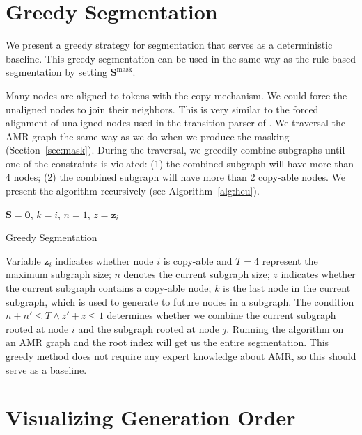 \documentclass[11pt]{article}
\begin{document}
\section{Greedy Segmentation} \label{append:greedy}
We present a greedy strategy for segmentation that serves as a deterministic baseline. This greedy segmentation can be used in the same way as the rule-based segmentation by setting $\mathbf{S}^\mathrm{mask}$. 

Many nodes are aligned to tokens with the copy mechanism. We could force the unaligned nodes to join their neighbors. This is very similar to the forced alignment of unaligned nodes used in the transition parser of . 
We traversal the AMR graph the same way as we do when we produce the masking (Section~\ref{sec:mask}).  During the traversal, we greedily combine subgraphs until one of the constraints is violated: (1) the combined subgraph will have more than 4 nodes; (2) the combined subgraph will have more than 2 copy-able nodes. We present the algorithm recursively (see Algorithm~\ref{alg:heu}).
\begin{algorithm}[ht!] 
\SetAlgoLined
{}
\vspace{1ex}
  $\mathbf{S} = \mathbf{0} $, $k=i$, $n=1$, $z=\mathbf{z}_i$\;
 \caption{Greedy Segmentation \label{alg:heu}}
\end{algorithm}
Variable $\mathbf{z}_i $ indicates whether node $i$ is copy-able and $T=4$ represent the maximum subgraph size; $n$ denotes the current subgraph size;  $z$ indicates whether the current subgraph contains a copy-able node; $k$ is the last node in the current subgraph, which is used to generate to future nodes in a subgraph. The condition $n+n'\leq T \land z'+z\leq 1$ determines whether we combine the current subgraph rooted at node $i$ and the subgraph rooted at node $j$. Running the algorithm on an AMR graph and the root index will get us the entire segmentation. This greedy method does not require any expert knowledge about AMR, so this should serve as a baseline. 




\section{Visualizing Generation Order}\label{append:seg_visual}
\end{document}
